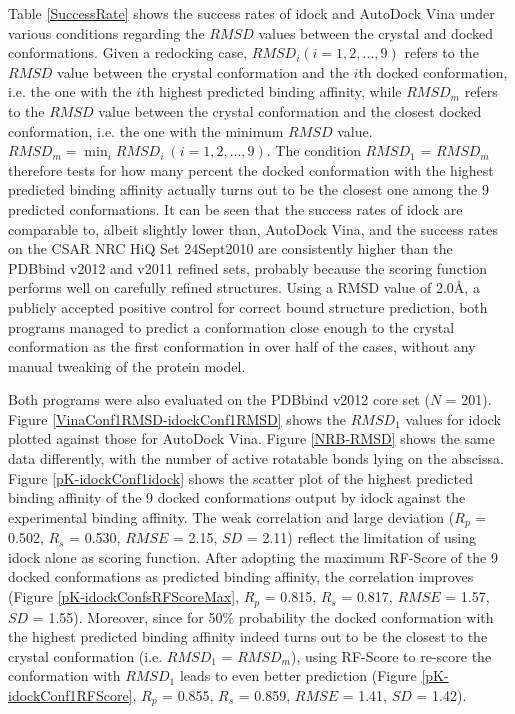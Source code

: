 \documentclass[10pt]{article}
\begin{document}
Table \ref{SuccessRate} shows the success rates of idock and AutoDock Vina under various conditions regarding the $RMSD$ values between the crystal and docked conformations. Given a redocking case, $RMSD_i (i = 1,2,...,9)$ refers to the $RMSD$ value between the crystal conformation and the $i$th docked conformation, i.e. the one with the $i$th highest predicted binding affinity, while $RMSD_m$ refers to the $RMSD$ value between the crystal conformation and the closest docked conformation, i.e. the one with the minimum $RMSD$ value. $RMSD_m = \displaystyle\min_{i}RMSD_i\ (i = 1,2,...,9)$. The condition $RMSD_1$ = $RMSD_m$ therefore tests for how many percent the docked conformation with the highest predicted binding affinity actually turns out to be the closest one among the 9 predicted conformations. It can be seen that the success rates of idock are comparable to, albeit slightly lower than, AutoDock Vina, and the success rates on the CSAR NRC HiQ Set 24Sept2010 are consistently higher than the PDBbind v2012 and v2011 refined sets, probably because the scoring function performs well on carefully refined structures. Using a RMSD value of 2.0\AA, a publicly accepted positive control for correct bound structure prediction, both programs managed to predict a conformation close enough to the crystal conformation as the first conformation in over half of the cases, without any manual tweaking of the protein model.

Both programs were also evaluated on the PDBbind v2012 core set ($N$ = 201). Figure \ref{VinaConf1RMSD-idockConf1RMSD} shows the $RMSD_1$ values for idock plotted against those for AutoDock Vina. Figure \ref{NRB-RMSD} shows the same data differently, with the number of active rotatable bonds lying on the abscissa. Figure \ref{pK-idockConf1idock} shows the scatter plot of the highest predicted binding affinity of the 9 docked conformations output by idock against the experimental binding affinity. The weak correlation and large deviation ($R_p$ = 0.502, $R_s$ = 0.530, $RMSE$ = 2.15, $SD$ = 2.11) reflect the limitation of using idock alone as scoring function. After adopting the maximum RF-Score of the 9 docked conformations as predicted binding affinity, the correlation improves (Figure \ref{pK-idockConfsRFScoreMax}, $R_p$ = 0.815, $R_s$ = 0.817, $RMSE$ = 1.57, $SD$ = 1.55). Moreover, since for 50\% probability the docked conformation with the highest predicted binding affinity indeed turns out to be the closest to the crystal conformation (i.e. $RMSD_1$ = $RMSD_m$), using RF-Score to re-score the conformation with $RMSD_1$ leads to even better prediction (Figure \ref{pK-idockConf1RFScore}, $R_p$ = 0.855, $R_s$ = 0.859, $RMSE$ = 1.41, $SD$ = 1.42).
\end{document}
